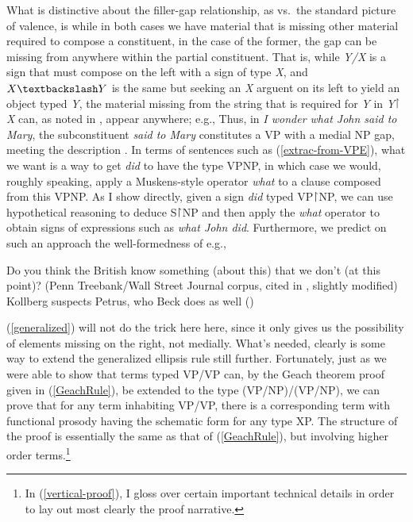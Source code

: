 \documentclass[output=paper,colorlinks,citecolor=brown]{langscibook}
\begin{document}
What is distinctive about the filler-gap relationship, as vs.\  the
standard picture of valence, is while in both cases we have material
that is missing other material required to compose a constituent, in
the case of the former, the gap can be missing from anywhere within
the partial constituent. That is, while \textit{Y/X} is a sign that must
compose on the left with a sign of type \textit{X}, and $X\bsl Y$ is the same
but seeking an \textit{X} arguent on its left to yield an object typed \textit{Y},
the material missing from the string that is required for \textit{Y} in
\textit{Y}\ensuremath{\vs}\textit{X} can, as noted in \textsection{\ref{sec:argstruc}}, appear
anywhere; e.g., Thus, in \textit{I wonder what John said to Mary}, the
subconstituent \textit{said {\gp}\xspace to Mary} constitutes a VP with a medial NP
gap, meeting the description . In terms of sentences such as
(\ref{extrac-from-VPE}), what we want is a way to get \textit{did} to have the type
VP\vs NP, in which case we would, roughly speaking, apply a Muskens-style
operator \textit{what} to a clause composed from this VP\vs NP. As I show
directly, given a sign \textit{did} typed VP\ensuremath{\vs}NP, we can use hypothetical
reasoning to deduce S\ensuremath{\vs}NP and then apply the \textit{what} operator to obtain
signs of expressions such as \textit{what John did}. Furthermore, we predict
on such an approach the well-formedness of e.g.,

\begin{exe}
 \ex\label{internal}
  \begin{xlist}
 \ex\label{}
    Do you think the British know something (about this) that we don't
(at this point)? (Penn Treebank/Wall Street Journal corpus, cited in
\citet{bos-spenader2011}, slightly modified)
 \ex\label{}
    Kollberg suspects Petrus, who Beck does {\gp}\xspace as well (\citet[666]{kennedy1995})
  \end{xlist}
\end{exe}
(\ref{generalized}) will not do the trick here here, since it only gives us
the possibility of elements missing on the right, not medially. What's
needed, clearly is some way to extend the generalized ellipsis rule
still further. Fortunately, just as we were able to show that terms
typed VP/VP can, by the Geach theorem proof given in (\ref{GeachRule}), be
extended to the type (VP/NP)/(VP/NP), we can prove that for any term
inhabiting VP/VP, there is a corresponding term with functional
prosody having the schematic form  for any type XP.
The structure of the proof is essentially the same as that of
(\ref{GeachRule}), but involving higher order terms.\footnote{In
(\ref{vertical-proof}), I gloss over certain important technical details in
order to lay out most clearly the proof narrative.}
\end{document}
